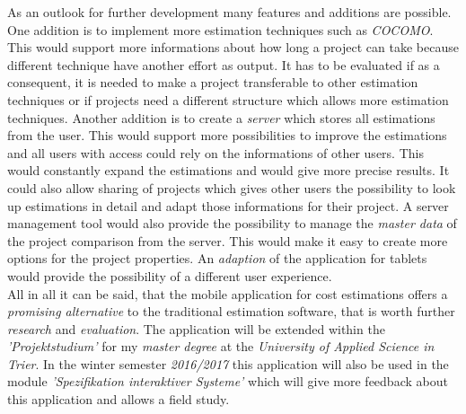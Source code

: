 As an outlook for further development many features and additions are possible. One addition is to implement more estimation techniques such as \textit{COCOMO}. This would support more informations about how long a project can take because different technique have another effort as output. It has to be evaluated if as a consequent, it is needed to make a project transferable to other estimation techniques or if projects need a different structure which allows more estimation techniques. Another addition is to create a \textit{server} which stores all estimations from the user. This would support more possibilities to improve the estimations and all users with access could rely on the informations of other users. This would constantly expand the estimations and would give more precise results. It could also allow sharing of projects which gives other users the possibility to look up estimations in detail and adapt those informations for their project. A server management tool would also provide the possibility to manage the \textit{master data} of the project comparison from the server. This would make it easy to create more options for the project properties. An \textit{adaption} of the application for tablets would provide the possibility of a different user experience.\\
All in all it can be said, that the mobile application for cost estimations offers a \textit{promising alternative} to the traditional estimation software, that is worth further \textit{research} and \textit{evaluation}. The application will be extended within the \textit{'Projektstudium'} for my \textit{master degree} at the \textit{University of Applied Science in Trier}. In the winter semester \textit{2016/2017} this application will also be used in the module \textit{'Spezifikation interaktiver Systeme'} which will give more feedback about this application and allows a field study.